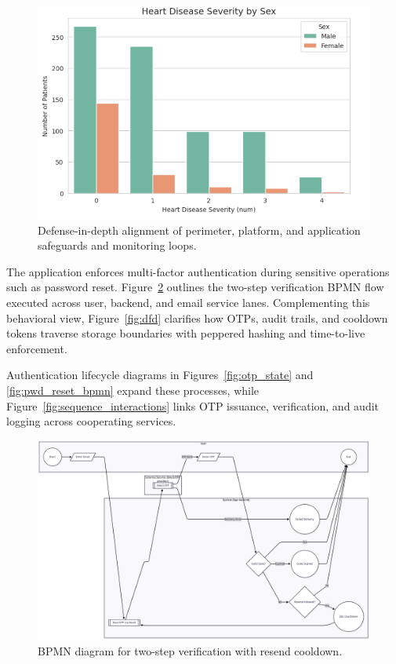 \documentclass[12pt]{article}
\begin{document}
\begin{figure}[t]
  \centering
  \includegraphics[width=0.9\linewidth]{fig_3_13_should_be_this.png}
  \caption{Defense-in-depth alignment of perimeter, platform, and application safeguards and monitoring loops.}
  \label{fig:defense_layers}
\end{figure}

The application enforces multi-factor authentication during sensitive operations such as password reset. Figure~\ref{fig:bpmn} outlines the two-step verification BPMN flow executed across user, backend, and email service lanes. Complementing this behavioral view, Figure~\ref{fig:dfd} clarifies how OTPs, audit trails, and cooldown tokens traverse storage boundaries with peppered hashing and time-to-live enforcement.

Authentication lifecycle diagrams in Figures~\ref{fig:otp_state} and \ref{fig:pwd_reset_bpmn} expand these processes, while Figure~\ref{fig:sequence_interactions} links OTP issuance, verification, and audit logging across cooperating services.

\begin{figure}[t]
  \centering
  \includegraphics[width=0.9\linewidth]{bpmn_for_two_step_verification.png}
  \caption{BPMN diagram for two-step verification with resend cooldown.}
  \label{fig:bpmn}
\end{figure}
\end{document}
